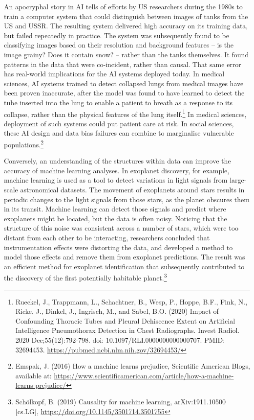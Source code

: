 An apocryphal story in AI tells of efforts by US researchers during the
1980s to train a computer system that could distinguish between images
of tanks from the US and USSR. The resulting system delivered high
accuracy on its training data, but failed repeatedly in practice. The
system was subsequently found to be classifying images based on their
resolution and background features -- is the image grainy? Does it
contain snow? -- rather than the tanks themselves. It found patterns in
the data that were co-incident, rather than causal. That same error has
real-world implications for the AI systems deployed today. In medical
sciences, AI systems trained to detect collapsed lungs from medical
images have been proven inaccurate, after the model was found to have
learned to detect the tube inserted into the lung to enable a patient to
breath as a response to its collapse, rather than the physical features
of the lung itself.\footnote{Rueckel, J., Trappmann, L., Schachtner, B.,
  Wesp, P., Hoppe, B.F., Fink, N., Ricke, J., Dinkel, J., Ingrisch, M.,
  and Sabel, B.O. (2020) Impact of Confounding Thoracic Tubes and
  Pleural Dehiscence Extent on Artificial Intelligence Pneumothorax
  Detection in Chest Radiographs. Invest Radiol. 2020
  Dec;55(12):792-798. doi: 10.1097/RLI.0000000000000707. PMID: 32694453.
  \url{https://pubmed.ncbi.nlm.nih.gov/32694453/}}
In medical sciences, deployment of such systems could put patient care
at risk. In social sciences, these AI design and data bias failures can
combine to marginalise vulnerable populations.\footnote{Emspak, J.
  (2016) How a machine learns prejudice, Scientific American Blogs,
  available at:
  \url{https://www.scientificamerican.com/article/how-a-machine-learns-prejudice/}}

Conversely, an understanding of the structures within data can improve
the accuracy of machine learning analyses. In exoplanet discovery, for
example, machine learning is used as a tool to detect variations in
light signals from large-scale astronomical datasets. The movement of
exoplanets around stars results in periodic changes to the light signals
from those stars, as the planet obscures them in its transit. Machine
learning can detect those signals and predict where exoplanets might be
located, but the data is often noisy. Noticing that the structure of
this noise was consistent across a number of stars, which were too
distant from each other to be interacting, researchers concluded that
instrumentation effects were distorting the data, and developed a method
to model those effects and remove them from exoplanet predictions. The
result was an efficient method for exoplanet identification that
subsequently contributed to the discovery of the first potentially
habitable planet.\footnote{Schölkopf, B. (2019) Causality for machine
  learning, arXiv:1911.10500 {[}cs.LG{]},
  \url{https://doi.org/10.1145/3501714.3501755}}

